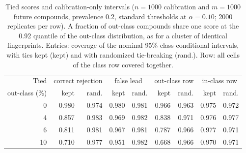 \begin{table}[ht]
\centering
\caption{Tied scores and calibration-only intervals ($n=1000$ calibration and $m=1000$ future compounds, prevalence 0.2, standard thresholds at $\alpha=0.10$; 2000 replicates per row). A fraction of out-class compounds share one score at the 0.92 quantile of the out-class distribution, as for a cluster of identical fingerprints. Entries: coverage of the nominal 95\% class-conditional intervals, with ties kept (kept) and with randomized tie-breaking (rand.). Row: all cells of the class row covered together.}
\label{tab:ties}
\small
\begin{tabular}{rrrrrrrrr}
\toprule
Tied & \multicolumn{2}{c}{correct rejection} & \multicolumn{2}{c}{false lead} & \multicolumn{2}{c}{out-class row} & \multicolumn{2}{c}{in-class row} \\
out-class (\%) & kept & rand. & kept & rand. & kept & rand. & kept & rand. \\
\midrule
0 & 0.980 & 0.974 & 0.980 & 0.981 & 0.966 & 0.963 & 0.975 & 0.972 \\
4 & 0.857 & 0.983 & 0.969 & 0.982 & 0.838 & 0.971 & 0.976 & 0.977 \\
6 & 0.811 & 0.981 & 0.967 & 0.981 & 0.787 & 0.966 & 0.977 & 0.971 \\
10 & 0.710 & 0.977 & 0.951 & 0.982 & 0.668 & 0.966 & 0.970 & 0.971 \\
\bottomrule
\end{tabular}
\end{table}
